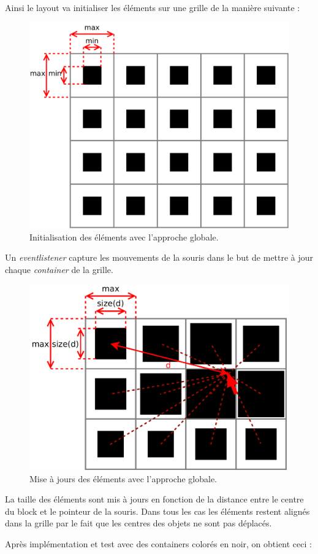 Ainsi le layout va initialiser les éléments sur une grille de la manière suivante :
\begin{figure}[H]
  \centering
  \includegraphics[width=.7\textwidth]{../resources/illustrations/grob_app_init}
  \caption{Initialisation des éléments avec l'approche globale.}
\end{figure}

Un \emph{eventlistener} capture les mouvements de la souris dans le but de mettre à jour chaque \emph{container} de la grille.

\begin{figure}[H]
  \centering
  \includegraphics[width=.7\textwidth]{../resources/illustrations/grob_app_mouse}
  \caption{Mise à jours des éléments avec l'approche globale.}
\end{figure}

La taille des éléments sont mis à jours en fonction de la distance entre le centre du block et le pointeur de la souris. Dans tous les cas les éléments restent alignés dans la grille par le fait que les centres des objets ne sont pas déplacés.

Après implémentation et test avec des containers colorés en noir, on obtient ceci :

